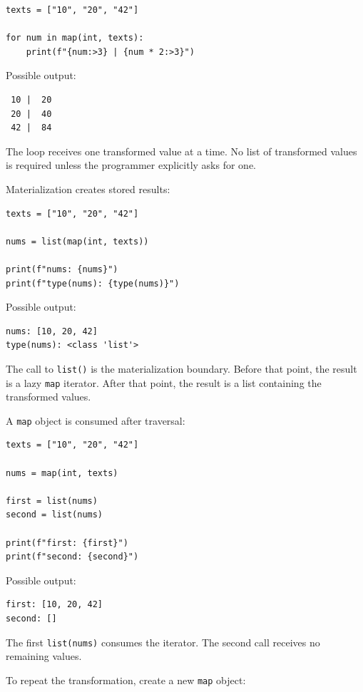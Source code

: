 \begin{verbatim}
texts = ["10", "20", "42"]

for num in map(int, texts):
    print(f"{num:>3} | {num * 2:>3}")
\end{verbatim}

Possible output:

\begin{verbatim}
 10 |  20
 20 |  40
 42 |  84
\end{verbatim}

The loop receives one transformed value at a time. No list of transformed values is required unless the programmer explicitly asks for one.

Materialization creates stored results:

\begin{verbatim}
texts = ["10", "20", "42"]

nums = list(map(int, texts))

print(f"nums: {nums}")
print(f"type(nums): {type(nums)}")
\end{verbatim}

Possible output:

\begin{verbatim}
nums: [10, 20, 42]
type(nums): <class 'list'>
\end{verbatim}

The call to \texttt{list()} is the materialization boundary. Before that point, the result is a lazy \texttt{map} iterator. After that point, the result is a list containing the transformed values.

A \texttt{map} object is consumed after traversal:

\begin{verbatim}
texts = ["10", "20", "42"]

nums = map(int, texts)

first = list(nums)
second = list(nums)

print(f"first: {first}")
print(f"second: {second}")
\end{verbatim}

Possible output:

\begin{verbatim}
first: [10, 20, 42]
second: []
\end{verbatim}

The first \texttt{list(nums)} consumes the iterator. The second call receives no remaining values.

To repeat the transformation, create a new \texttt{map} object:

